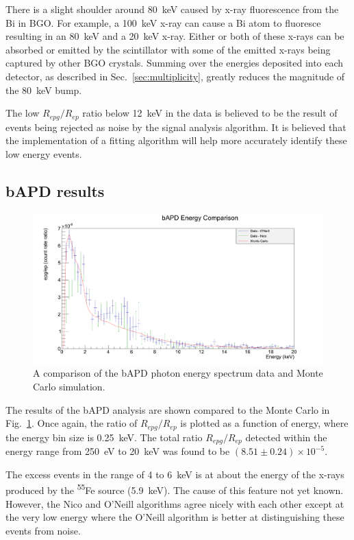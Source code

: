 \documentclass[oneside,12pt]{memoir}
\begin{document}
There is a slight shoulder around 80~keV caused by x-ray fluorescence from the Bi in BGO. For example, a 100~keV x-ray can cause a Bi atom to fluoresce resulting in an 80~keV and a 20~keV x-ray. Either or both of these x-rays can be absorbed or emitted by the scintillator with some of the emitted x-rays being captured by other BGO crystals. Summing over the energies deposited into each detector, as described in Sec.~\ref{sec:multiplicity}, greatly reduces the magnitude of the 80~keV bump.\par
The low $R_{epg}/R_{ep}$ ratio below 12~keV in the data is believed to be the result of events being rejected as noise by the signal analysis algorithm. It is believed that the implementation of a fitting algorithm will help more accurately identify these low energy events.\par 

\subsection{bAPD results}
\label{sec:bapd_results}
\begin{figure}[t]
	\includegraphics[width=\textwidth]{bapd_comparison.png}
	\caption[Comparison of bAPD data and Monte Carlo.]{A comparison of the bAPD photon energy spectrum data and Monte Carlo simulation.}
	\label{fig:bapd_mc_comp}
\end{figure}
The results of the bAPD analysis are shown compared to the Monte Carlo in Fig.~\ref{fig:bapd_mc_comp}. Once again, the ratio of $R_{epg}/R_{ep}$ is plotted as a function of energy, where the energy bin size is 0.25~keV. The total ratio $R_{epg}/R_{ep}$ detected within the energy range from 250~eV to 20~keV was found to be $(8.51\pm 0.24)\times 10^{-5}$.\par
The excess events in the range of 4 to 6~keV is at about the energy of the x-rays produced by the \textsuperscript{55}Fe source (5.9~keV). The cause of this feature not yet known. However, the Nico and O'Neill algorithms agree nicely with each other except at the very low energy where the O'Neill algorithm is better at distinguishing these events from noise.
\end{document}
